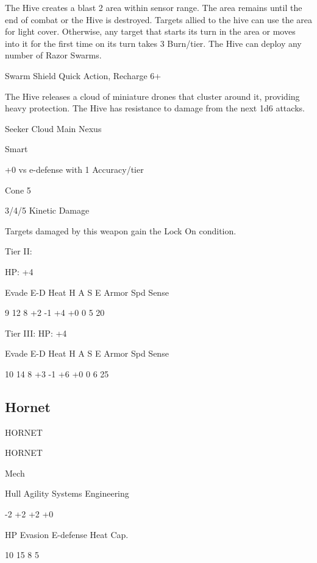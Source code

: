 The Hive creates a blast 2 area within sensor range. The area remains until the end of combat or  
the Hive is destroyed. Targets allied to the hive can use the area for light cover. Otherwise, any  
target that starts its turn in the area or moves into it for the first time on its turn takes 3 Burn/tier.  
The Hive can deploy any number of Razor Swarms.
 

Swarm Shield  
Quick Action, Recharge 6+
 
The Hive releases a cloud of miniature drones that cluster around it, providing heavy protection.  
The Hive has resistance to damage from the next 1d6 attacks.
 

Seeker Cloud  
Main Nexus
 
Smart
 
+0 vs e-defense with 1 Accuracy/tier
 
Cone 5
 
3/4/5 Kinetic Damage
 
Targets damaged by this weapon gain the Lock On condition.
 

Tier II:
 
HP: +4
 

          Evade    E-D    Heat    H    A     S    E       Armor        Spd      Sense 

         9         12     8       +2   -1    +4   +0       0           5        20 

Tier III:  
HP: +4
 

          Evade    E-D    Heat    H    A     S    E       Armor        Spd      Sense 

          10       14     8       +3   -1    +6   +0       0           6        25 

                                                                                                             
\subsection{Hornet}

                                                HORNET  

 HORNET 

 Mech 

 Hull       Agility      Systems       Engineering 

 -2         +2           +2            +0 

 HP         Evasion      E-defense     Heat Cap. 

 10         15           8             5 

